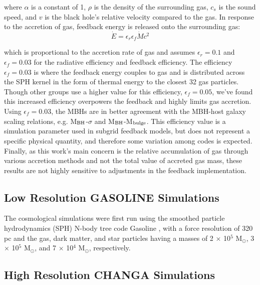 \documentclass[manuscript]{aastex}
\begin{document}
where $\alpha$ is a constant of 1, $\rho$ is the density of the surrounding gas, $c_s$ is the sound speed, and $v$ is the black hole's relative velocity compared to the gas. In response to the accretion of gas, feedback energy is released onto the surrounding gas:
\begin{equation}
\dot{E} = \epsilon _{r} \epsilon _{f} \dot{M} c^2 
\end{equation}

which is proportional to the accretion rate of gas and assumes $\epsilon _r = 0.1$ and $\epsilon _f = 0.03$ for the radiative efficiency and feedback efficiency. The efficiency $\epsilon _f = 0.03$ is where the feedback energy couples to gas and is distributed across the SPH kernel in the form of thermal energy to the closest 32 gas particles. Though other groups \citep{Sijacki2007,DiMatteo2008} use a higher value for this efficiency, $\epsilon _f = 0.05$, we've found this increased efficiency overpowers the feedback and highly limits gas accretion. Using $\epsilon _f = 0.03$, the MBHs are in better agreement with the MBH-host galaxy scaling relations, e.g. M$_{\rm BH}$-$\sigma$ and M$_{\rm BH}$-M$_{\rm bulge}$. This efficiency value is a simulation parameter used in subgrid feedback models, but does not represent a specific physical quantity, and therefore some variation among codes is expected. Finally, as this work's main concern is the relative accumulation of gas through various accretion methods and not the total value of accreted gas mass, these results are not highly sensitive to adjustments in the feedback implementation.
 
\subsection{Low Resolution GASOLINE Simulations}

The cosmological simulations were first run using the smoothed particle hydrodynamics (SPH) N-body tree code Gasoline \citep[][Stadel 2001, how do I cite a thesis?]{Wadsley2004}, with a force resolution of 320 pc and the gas, dark matter, and star particles having a masses of 2 $\times$ 10$^5$ M$_{\odot}$, 3 $\times$ 10$^5$ M$_{\odot}$, and 7 $\times$ 10$^4$ M$_{\odot}$, respectively.  
	

\subsection{High Resolution CHANGA Simulations}
\end{document}
